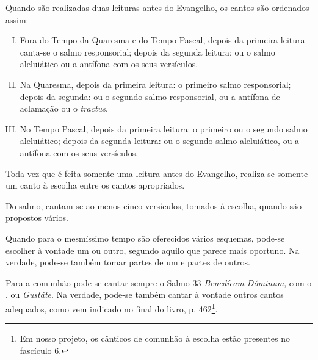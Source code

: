 Quando são realizadas duas leituras antes do Evangelho, os cantos são ordenados assim:
\begin{enumerate}[I)]
  \item Fora do Tempo da Quaresma e do Tempo Pascal, depois da primeira leitura canta-se o salmo responsorial; depois da segunda leitura: ou o salmo aleluiático ou a antífona \textcolor{gregoriocolor}{\Al} com os seus versículos.

  \item Na Quaresma, depois da primeira leitura: o primeiro salmo responsorial; depois da segunda: ou o segundo salmo responsorial, ou a antífona de aclamação ou o \emph{tractus}.

  \item No Tempo Pascal, depois da primeira leitura: o primeiro ou o segundo salmo aleluiático; depois da segunda leitura: ou o segundo salmo aleluiático, ou a antífona \textcolor{gregoriocolor}{\Al} com os seus versículos.
\end{enumerate}

Toda vez que é feita somente uma leitura antes do Evangelho, realiza-se somente um canto à escolha entre os cantos apropriados.

Do salmo, cantam-se ao menos cinco versículos, tomados à escolha, quando são propostos vários.

 Quando para o mesmíssimo tempo são oferecidos vários esquemas, pode-se escolher à vontade um ou outro, segundo aquilo que parece mais oportuno. Na verdade, pode-se também tomar partes de um e partes de outros.

Para a comunhão pode-se cantar sempre o Salmo 33 \textcolor{gregoriocolor}{\emph{Benedícam Dóminum}}, com o \Rbar. \textcolor{gregoriocolor}{\Al} ou \textcolor{gregoriocolor}{\emph{Gustáte}}. Na verdade, pode-se também cantar à vontade outros cantos adequados, como vem indicado no final do livro, p. \textcolor{gregoriocolor}{462}\footnote{Em nosso projeto, os cânticos de comunhão à escolha estão presentes no fascículo 6.}.